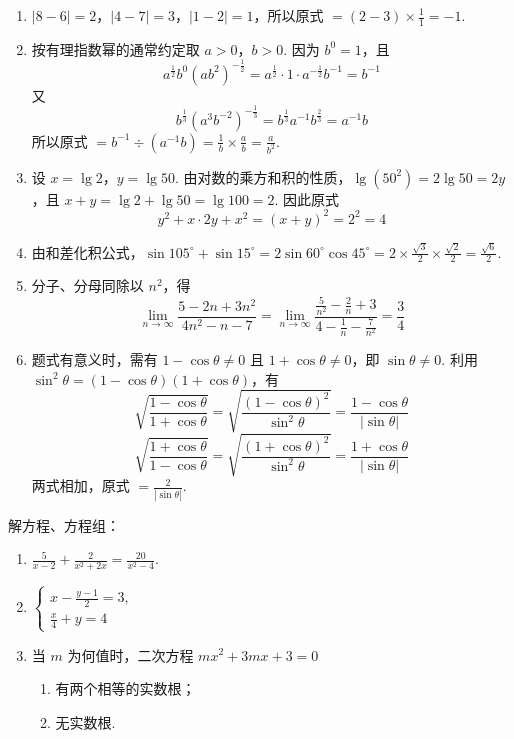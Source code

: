 \begin{solution}
\begin{enumerate}
\item \(\left|8-6\right|=2\)，\(\left|4-7\right|=3\)，\(\left|1-2\right|=1\)，所以原式 \(=(2-3)\times\frac{1}{1}=-1\).
\item 按有理指数幂的通常约定取 \(a>0\)，\(b>0\). 因为 \(b^0=1\)，且
\[
a^{\frac12}b^0\left(ab^2\right)^{-\frac12}=a^{\frac12}\cdot1\cdot a^{-\frac12}b^{-1}=b^{-1}
\]
又
\[
b^{\frac13}\left(a^3b^{-2}\right)^{-\frac13}=b^{\frac13}a^{-1}b^{\frac23}=a^{-1}b
\]
所以原式 \(=b^{-1}\div\left(a^{-1}b\right)=\frac{1}{b}\times\frac{a}{b}=\frac{a}{b^2}\).
\item 设 \(x=\lg2\)，\(y=\lg50\). 由对数的乘方和积的性质，\(\lg\left(50^2\right)=2\lg50=2y\)，且 \(x+y=\lg2+\lg50=\lg100=2\). 因此原式
\[
y^2+x\cdot2y+x^2=(x+y)^2=2^2=4
\]
\item 由和差化积公式，\(\sin105^\circ+\sin15^\circ=2\sin60^\circ\cos45^\circ=2\times\frac{\sqrt3}{2}\times\frac{\sqrt2}{2}=\frac{\sqrt6}{2}\).
\item 分子、分母同除以 \(n^2\)，得
\[
\displaystyle\lim_{n\to\infty}\frac{5-2n+3n^2}{4n^2-n-7}=\lim_{n\to\infty}\frac{\frac{5}{n^2}-\frac{2}{n}+3}{4-\frac{1}{n}-\frac{7}{n^2}}=\frac{3}{4}
\]
\item 题式有意义时，需有 \(1-\cos\theta\neq0\) 且 \(1+\cos\theta\neq0\)，即 \(\sin\theta\neq0\). 利用 \(\sin^2\theta=(1-\cos\theta)(1+\cos\theta)\)，有
\[
\sqrt{\frac{1-\cos\theta}{1+\cos\theta}}=\sqrt{\frac{(1-\cos\theta)^2}{\sin^2\theta}}=\frac{1-\cos\theta}{\left|\sin\theta\right|}
\]
\[
\sqrt{\frac{1+\cos\theta}{1-\cos\theta}}=\sqrt{\frac{(1+\cos\theta)^2}{\sin^2\theta}}=\frac{1+\cos\theta}{\left|\sin\theta\right|}
\]
两式相加，原式 \(=\frac{2}{\left|\sin\theta\right|}\).
\end{enumerate}
\end{solution}

\begin{problem}
解方程、方程组：

\begin{enumerate}
\item \(\frac{5}{x-2}+\frac{2}{x^2+2x}=\frac{20}{x^2-4}\).
\item \(\begin{cases}
x-\frac{y-1}{2}=3,\\
\frac{x}{4}+y=4
\end{cases}
\)
\item 当 \(m\) 为何值时，二次方程 \(mx^2+3mx+3=0\)

\begin{enumerate}
\item 有两个相等的实数根；
\item 无实数根.
\end{enumerate}
\end{enumerate}
\end{problem}

